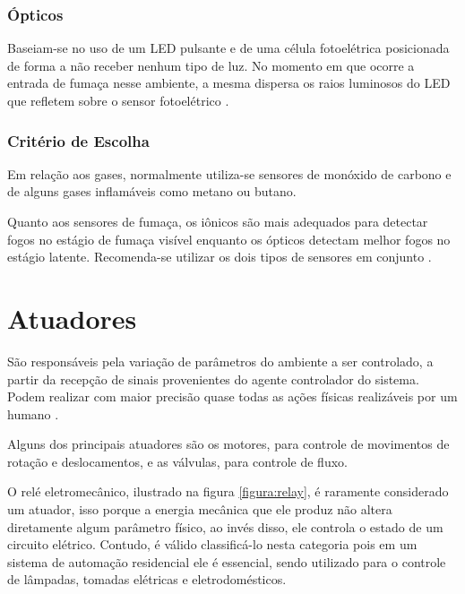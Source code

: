 \subsubsection{Ópticos}
Baseiam-se no uso de um LED pulsante e de uma célula fotoelétrica posicionada de forma a não receber nenhum
tipo de luz. No momento em que ocorre a entrada de fumaça nesse ambiente, a mesma dispersa os raios luminosos do
LED que refletem sobre o sensor fotoelétrico \cite{thomazini_albuquerque2005}.

\subsubsection{Critério de Escolha}
Em relação aos gases, normalmente utiliza-se sensores de monóxido de carbono e de alguns gases inflamáveis como
metano ou butano.

Quanto aos sensores de fumaça, os iônicos são mais adequados para detectar fogos no estágio de fumaça visível
enquanto os ópticos detectam melhor fogos no estágio latente. Recomenda-se utilizar os dois tipos de sensores
em conjunto \cite{sinclair2001}.

\section{Atuadores}
São responsáveis pela variação de parâmetros do ambiente a ser controlado, a partir da recepção de sinais
provenientes do agente controlador do sistema. Podem realizar com maior precisão quase todas as ações físicas
realizáveis por um humano \cite{kondrasovas2013}.

Alguns dos principais atuadores são os motores, para controle de movimentos de rotação e deslocamentos, e as
válvulas, para controle de fluxo.

O relé eletromecânico, ilustrado na figura \ref{figura:relay}, é raramente considerado um atuador, isso porque a energia
mecânica que ele produz não altera diretamente algum parâmetro físico, ao invés disso, ele controla o estado de
um circuito elétrico. Contudo, é válido classificá-lo nesta categoria pois em um sistema de automação
residencial ele é essencial, sendo utilizado para o controle de lâmpadas, tomadas elétricas e
eletrodomésticos.

